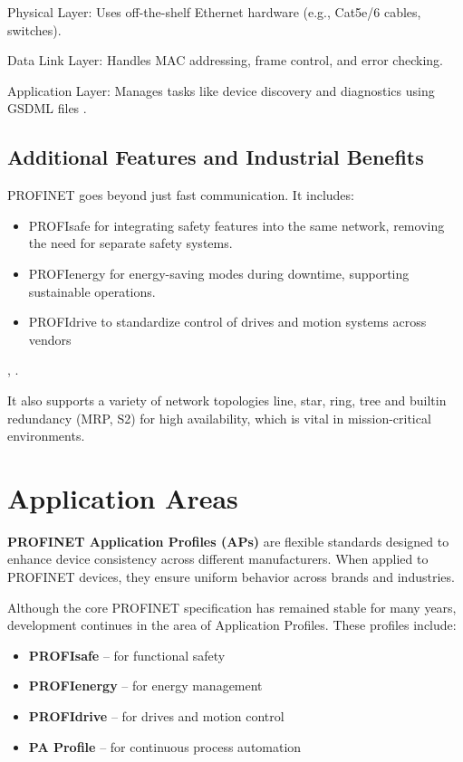 \documentclass[conference]{IEEEtran}
\begin{document}
Physical Layer: Uses off-the-shelf Ethernet hardware (e.g., Cat5e/6 cables, switches).

Data Link Layer: Handles MAC addressing, frame control, and error checking.

Application Layer: Manages tasks like device discovery and diagnostics using GSDML files \cite{patzke1998fieldbus}.

\subsection{Additional Features and Industrial Benefits}
PROFINET goes beyond just fast communication. It includes:

\begin{itemize}
    \item PROFIsafe for integrating safety features into the same network, removing the need for separate safety systems.
    \item PROFIenergy for energy-saving modes during downtime, supporting sustainable operations.
    \item PROFIdrive to standardize control of drives and motion systems across vendors 
\end{itemize}




\cite{galloway2012industrial}, \cite{jasperneite2007limits}.

It also supports a variety of network topologies line, star, ring, tree and builtin redundancy (MRP, S2) for high availability, which is vital in mission-critical environments.

\section{Application Areas}
\textbf{PROFINET Application Profiles (APs)} are flexible standards designed to enhance device consistency across different manufacturers. When applied to PROFINET devices, they ensure uniform behavior across brands and industries.

Although the core PROFINET specification has remained stable for many years, development continues in the area of Application Profiles. These profiles include:

\begin{itemize}
    \item \textbf{PROFIsafe} – for functional safety
    \item \textbf{PROFIenergy} – for energy management
    \item \textbf{PROFIdrive} – for drives and motion control
    \item \textbf{PA Profile} – for continuous process automation
\end{itemize}
\end{document}
